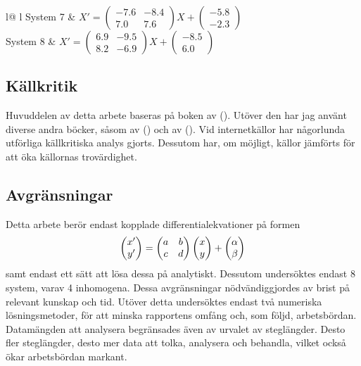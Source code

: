 \begin{table}[h!]
\begin{tabular}{
        l@{\hskip 0.4in}
        l
    }
        System 7 & \(X'=\begin{pmatrix}-7.6 & -8.4 \\ 7.0 & 7.6\end{pmatrix}X + \begin{pmatrix}-5.8\\-2.3\end{pmatrix}\)\vspace{1em}\\
        
        System 8 & \(X'=\begin{pmatrix}6.9 & -9.5 \\ 8.2 & -6.9\end{pmatrix}X + \begin{pmatrix}-8.5\\6.0\end{pmatrix}\)\vspace{0.75em}\\
        
        \tblh
    \end{tabular}
\end{table}

\subsection{Källkritik}
Huvuddelen av detta arbete baseras på boken  av \citeauthor{zill_differential_2005} (\citeyear{zill_differential_2005}). Utöver den har jag använt diverse andra böcker, såsom  av \citeauthor{suli_introduction_2003} (\citeyear{suli_introduction_2003}) och  av \citeauthor{atkinson_introduction_1989} (\citeyear{atkinson_introduction_1989}). Vid internetkällor har någorlunda utförliga källkritiska analys gjorts. Dessutom har, om möjligt, källor jämförts för att öka källornas trovärdighet.

\subsection{Avgränsningar}
Detta arbete berör endast kopplade differentialekvationer på formen
\begin{equation}
    \begin{pmatrix}x'\\y'\end{pmatrix}=\begin{pmatrix}a&b\\c&d\end{pmatrix}\begin{pmatrix}x\\y\end{pmatrix}+\begin{pmatrix}\alpha\\\beta\end{pmatrix}
\end{equation} samt endast ett sätt att lösa dessa på analytiskt. Dessutom undersöktes endast 8 system, varav 4 inhomogena. Dessa avgränsningar nödvändiggjordes av brist på relevant kunskap och tid. Utöver detta undersöktes endast två numeriska lösningsmetoder, för att minska rapportens omfång och, som följd, arbetsbördan. Datamängden att analysera begränsades även av urvalet av steglängder. Desto fler steglängder, desto mer data att tolka, analysera och behandla, vilket också ökar arbetsbördan markant.
